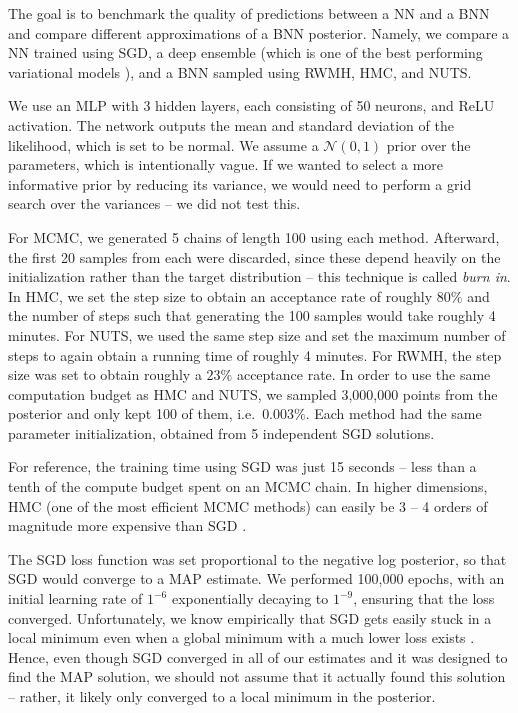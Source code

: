 \documentclass[12pt]{article}
\begin{document}
The goal is to benchmark the quality of predictions between a NN and a BNN and compare different approximations of a BNN posterior. Namely, we compare a NN trained using SGD, a deep ensemble (which is one of the best performing variational models \cite{bnn_posterior}), and a BNN sampled using RWMH, HMC, and NUTS.

We use an MLP with 3 hidden layers, each consisting of 50 neurons, and ReLU activation. The network outputs the mean and standard deviation of the likelihood, which is set to be normal. We assume a $\mathcal{N}(0, 1)$ prior over the parameters, which is intentionally vague. If we wanted to select a more informative prior by reducing its variance, we would need to perform a grid search over the variances -- we did not test this.

For MCMC, we generated 5 chains of length 100 using each method. Afterward, the first 20 samples from each were discarded, since these depend heavily on the initialization rather than the target distribution -- this technique is called \textit{burn in}. In HMC, we set the step size to obtain an acceptance rate of roughly $80\%$ and the number of steps such that generating the 100 samples would take roughly 4 minutes. For NUTS, we used the same step size and set the maximum number of steps to again obtain a running time of roughly 4 minutes. For RWMH, the step size was set to obtain roughly a $23\%$ acceptance rate. In order to use the same computation budget as HMC and NUTS, we sampled 3,000,000 points from the posterior and only kept 100 of them, i.e.\ $0.003\%$. Each method had the same parameter initialization, obtained from 5 independent SGD solutions.

For reference, the training time using SGD was just 15 seconds -- less than a tenth of the compute budget spent on an MCMC chain. In higher dimensions, HMC (one of the most efficient MCMC methods) can easily be 3 -- 4 orders of magnitude more expensive than SGD \cite{bnn_posterior}.

The SGD loss function was set proportional to the negative log posterior, so that SGD would converge to a MAP estimate. We performed 100,000 epochs, with an initial learning rate of $1^{-6}$ exponentially decaying to $1^{-9}$, ensuring that the loss converged. Unfortunately, we know empirically that SGD gets easily stuck in a local minimum even when a global minimum with a much lower loss exists \cite{knowledge_distillation}. Hence, even though SGD converged in all of our estimates and it was designed to find the MAP solution, we should not assume that it actually found this solution -- rather, it likely only converged to a local minimum in the posterior.
\end{document}
